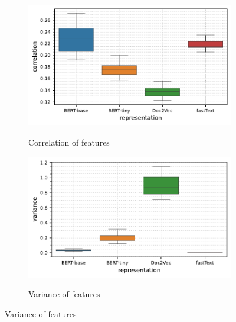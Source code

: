 \begin{figure}[t]
    \centering
    \begin{subfigure}[b]{0.495\textwidth}
        \centering
        \caption{\small Correlation of features}
        \includegraphics[width=\textwidth]{images/real-characteristics/text-20newsgroups/properties-20newsgroups-abscorr(representation,representation)-representation_BERT-base,BERT-tiny,Doc2Vec,fastText-class_0,16-data_ID-train.pdf}
        \label{fig:text-20newsgroups-abscorr}
    \end{subfigure}
    \hfill
    \begin{subfigure}[b]{0.495\textwidth}
        \centering
        \caption{\small Variance of features}
        \includegraphics[width=\textwidth]{images/real-characteristics/text-20newsgroups/properties-20newsgroups-var(representation,representation)-representation_BERT-base,BERT-tiny,Doc2Vec,fastText-class_0,16-data_ID-train.pdf}
        \label{fig:text-20newsgroups-var}
    \end{subfigure}

\end{figure}
